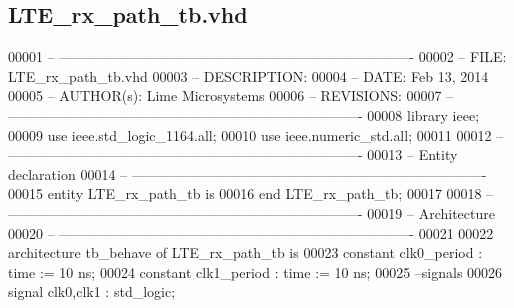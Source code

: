 \subsection{L\+T\+E\+\_\+rx\+\_\+path\+\_\+tb.\+vhd}
\label{LTE__rx__path__tb_8vhd_source}

\begin{DoxyCode}
00001 \textcolor{keyword}{-- ---------------------------------------------------------------------------- }
00002 \textcolor{keyword}{-- FILE:    LTE\_rx\_path\_tb.vhd}
00003 \textcolor{keyword}{-- DESCRIPTION: }
00004 \textcolor{keyword}{-- DATE:    Feb 13, 2014}
00005 \textcolor{keyword}{-- AUTHOR(s):   Lime Microsystems}
00006 \textcolor{keyword}{-- REVISIONS:}
00007 \textcolor{keyword}{-- ---------------------------------------------------------------------------- }
00008 \textcolor{vhdlkeyword}{library }\textcolor{keywordflow}{ieee};
00009 \textcolor{vhdlkeyword}{use }ieee.std\_logic\_1164.\textcolor{keywordflow}{all};
00010 \textcolor{vhdlkeyword}{use }ieee.numeric\_std.\textcolor{keywordflow}{all};
00011 
00012 \textcolor{keyword}{-- ----------------------------------------------------------------------------}
00013 \textcolor{keyword}{-- Entity declaration}
00014 \textcolor{keyword}{-- ----------------------------------------------------------------------------}
00015 \textcolor{keywordflow}{entity }LTE_rx_path_tb \textcolor{keywordflow}{is}
00016 \textcolor{keywordflow}{end} \textcolor{vhdlchar}{LTE\_rx\_path\_tb};
00017 
00018 \textcolor{keyword}{-- ----------------------------------------------------------------------------}
00019 \textcolor{keyword}{-- Architecture}
00020 \textcolor{keyword}{-- ----------------------------------------------------------------------------}
00021 
00022 \textcolor{keywordflow}{architecture} tb\_behave \textcolor{keywordflow}{of} LTE_rx_path_tb is
00023     \textcolor{keywordflow}{constant} \textcolor{vhdlchar}{clk0_period}   \textcolor{vhdlchar}{:} \textcolor{comment}{time} \textcolor{vhdlchar}{:=} \textcolor{vhdllogic}{}\textcolor{vhdllogic}{10} \textcolor{vhdlchar}{ns};
00024     \textcolor{keywordflow}{constant} \textcolor{vhdlchar}{clk1_period}   \textcolor{vhdlchar}{:} \textcolor{comment}{time} \textcolor{vhdlchar}{:=} \textcolor{vhdllogic}{}\textcolor{vhdllogic}{10} \textcolor{vhdlchar}{ns}; 
00025 \textcolor{keyword}{  --signals}
00026     \textcolor{keywordflow}{signal} \textcolor{vhdlchar}{clk0}\textcolor{vhdlchar}{,}\textcolor{vhdlchar}{clk1}        \textcolor{vhdlchar}{:} \textcolor{comment}{std\_logic};

\end{DoxyCode}
